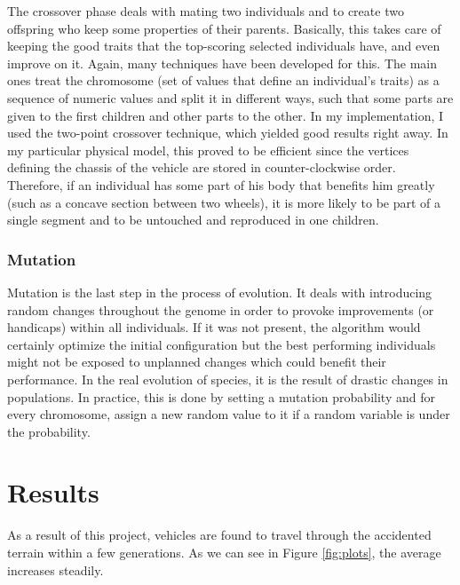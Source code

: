 \documentclass[12pt,Bold,letterpaper,TexShade]{mcgilletdclass}
\begin{document}
The crossover phase deals with mating two individuals and to create two offspring who keep some properties of their parents. Basically, this takes care of keeping the good traits that the top-scoring selected individuals have, and even improve on it. Again, many techniques have been developed for this. The main ones treat the chromosome (set of values that define an individual's traits) as a sequence of numeric values and split it in different ways, such that some parts are given to the first children and other parts to the other. In my implementation, I used the two-point crossover technique, which yielded good results right away. In my particular physical model, this proved to be efficient since the vertices defining the chassis of the vehicle are stored in counter-clockwise order. Therefore, if an individual has some part of his body that benefits him greatly (such as a concave section between two wheels), it is more likely to be part of a single segment and to be untouched and reproduced in one children.

\subsubsection{Mutation}

Mutation is the last step in the process of evolution. It deals with introducing random changes throughout the genome in order to provoke improvements (or handicaps) within all individuals. If it was not present, the algorithm would certainly optimize the initial configuration but the best performing individuals might not be exposed to unplanned changes which could benefit their performance. In the real evolution of species, it is the result of drastic changes in populations. In practice, this is done by setting a mutation probability and for every chromosome, assign a new random value to it if a random variable is under the probability.

\section{Results}

As a result of this project, vehicles are found to travel through the accidented terrain within a few generations. As we can see in Figure \ref{fig:plots}, the average increases steadily.
\end{document}
